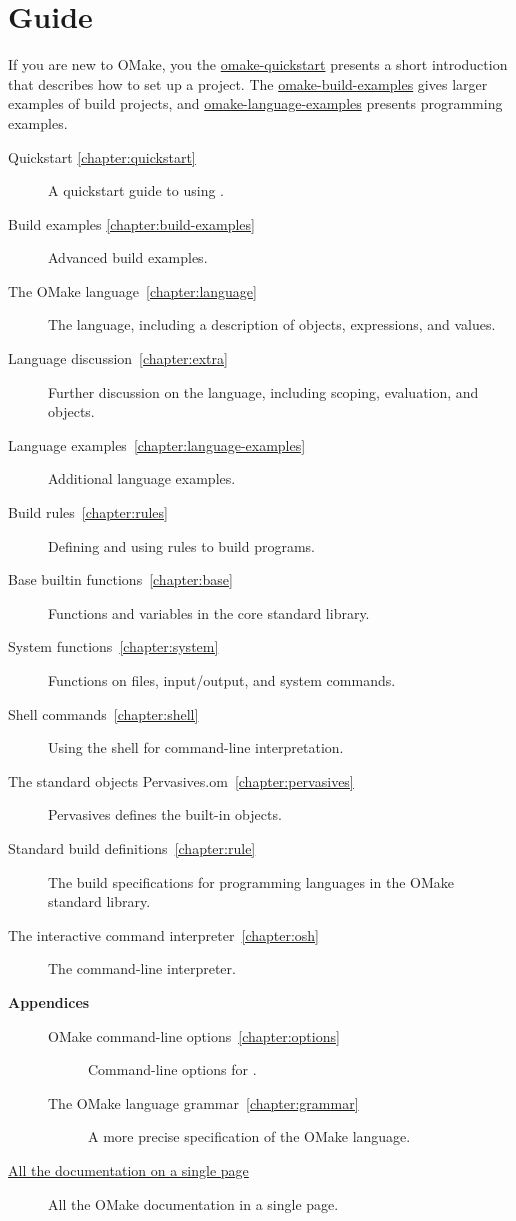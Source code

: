 %
\chapter{Guide}
\label{chapter:omake}
\label{section:guide}

If you are new to OMake, you the \href{omake-quickstart.html}{omake-quickstart} presents a short
introduction that describes how to set up a project.  The
\href{omake-build-examples.html}{omake-build-examples} gives larger examples of build projects, and
\href{omake-language-examples.html}{omake-language-examples} presents programming examples.

\begin{description}
\item[Quickstart \ref{chapter:quickstart}]
%
   A quickstart guide to using .
\item[Build examples \ref{chapter:build-examples}]
%
   Advanced build examples.
\item[The OMake language~\ref{chapter:language}]
%
   The  language, including a description of objects, expressions, and values.
\item[Language discussion~\ref{chapter:extra}]
%
   Further discussion on the language, including scoping, evaluation, and objects.
\item[Language examples~\ref{chapter:language-examples}]
%
   Additional language examples.
\item[Build rules~\ref{chapter:rules}]
%
   Defining and using rules to build programs.
\item[Base builtin functions~\ref{chapter:base}]
%
   Functions and variables in the core standard library.
\item[System functions~\ref{chapter:system}]
%
   Functions on files, input/output, and system commands.
\item[Shell commands~\ref{chapter:shell}]
%
   Using the  shell for command-line interpretation.
\item[The standard objects Pervasives.om~\ref{chapter:pervasives}]
%
   Pervasives defines the built-in objects.
\item[Standard build definitions~\ref{chapter:rule}]
%
   The build specifications for programming languages in the OMake standard library.
\item[The interactive command interpreter~\ref{chapter:osh}]
%
   The  command-line interpreter.
\item[\textbf{Appendices}]
\begin{description}
\item[OMake command-line options~\ref{chapter:options}]
%
   Command-line options for .
%
\item[The OMake language grammar~\ref{chapter:grammar}]
%
   A more precise specification of the OMake language.
\end{description}
\item[\href{omake-doc.html}{All the documentation on a single page}]
%
   All the OMake documentation in a single page.
\end{description}

